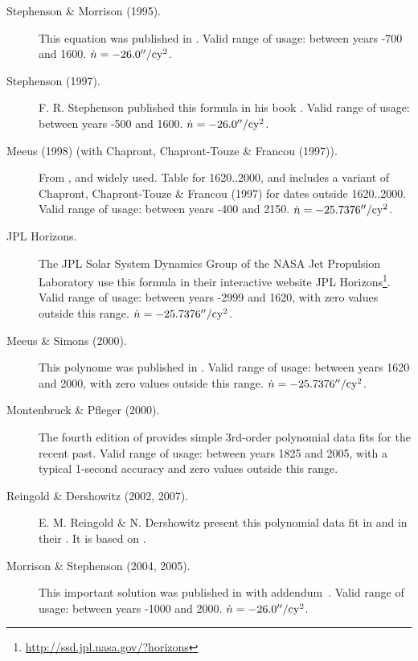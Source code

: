 \begin{description}
\item[Stephenson \& Morrison (1995).] This equation was published in . 
  Valid range of usage: between years -700 and 1600. $\dot{n}=-26.0''/\mathrm{cy}^2$.

\item[Stephenson (1997).] F. R. Stephenson published this formula in
  his book . Valid range of usage: between
  years -500 and 1600. $\dot{n}=-26.0''/\mathrm{cy}^2$.

\item[Meeus (1998) (with Chapront, Chapront-Touze \& Francou (1997)).]
  From , and widely
  used. Table for 1620..2000, and includes a variant of Chapront,
  Chapront-Touze \& Francou (1997) for dates outside 1620..2000. 
  Valid range of usage: between years -400 and 2150. $\dot{n}=-25.7376''/\mathrm{cy}^2$.

\item[JPL Horizons.] The JPL Solar System Dynamics Group of the NASA
  Jet Propulsion Laboratory use this formula in their interactive
  website JPL
  Horizons\footnote{\url{http://ssd.jpl.nasa.gov/?horizons}}. Valid
  range of usage: between years -2999 and 1620, with zero values
  outside this range. $\dot{n}=-25.7376''/\mathrm{cy}^2$.

\item[Meeus \& Simons (2000).] This polynome was published in . 
  Valid range of usage: between years 1620 and 2000, with zero values outside this
  range. $\dot{n}=-25.7376''/\mathrm{cy}^2$.

\item[Montenbruck \& Pfleger (2000).] The fourth edition of
   provides simple 3rd-order
  polynomial data fits for the recent past. Valid range of usage:
  between years 1825 and 2005, with a typical 1-second accuracy and
  zero values outside this range.

\item[Reingold \& Dershowitz (2002, 2007).] E. M. Reingold \&
  N. Dershowitz present this polynomial data fit in  and in their
  . It is
  based on .

\item[Morrison \& Stephenson (2004, 2005).] This important solution
  was published in %
   with
  addendum~\citep{2005JHA....36..339M}. Valid range of usage: between
  years -1000 and 2000. $\dot{n}=-26.0''/\mathrm{cy}^2$.


\end{description}
